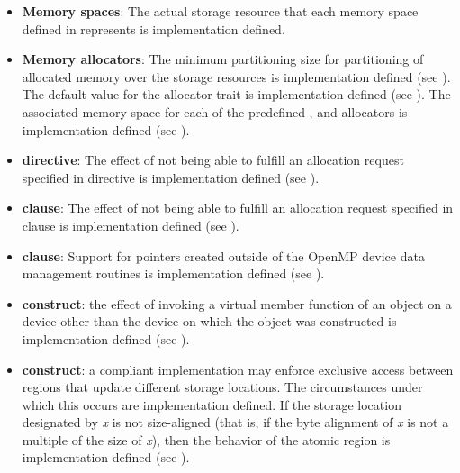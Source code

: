 \begin{itemize}
\item \textbf{Memory spaces}: The actual storage resource that each memory space defined in  represents is implementation defined.

\item \textbf{Memory allocators}: The minimum partitioning size for partitioning of allocated memory over the storage resources is implementation defined (see ).
The default value for the  allocator trait is implementation defined (see ).
The associated memory space for each of the predefined ,  and  allocators is implementation defined (see  ).

\item {} \textbf{directive}: The effect of not being able to fulfill an allocation request specified in  directive is implementation defined (see ).

\item {} \textbf{clause}: The effect of not being able to fulfill an allocation request specified in  clause is implementation defined (see ).

\item {} \textbf{clause}:
  Support for pointers created outside of the OpenMP device data management
  routines is implementation defined (see ).

\item {} \textbf{construct}: the effect of invoking a virtual member
function of an object on a device other than the device on which the object was
constructed is implementation defined (see ).

\item {} \textbf{construct}: a compliant implementation may enforce exclusive access
between  regions that update different storage locations. The circumstances
under which this occurs are implementation defined. If the storage location
designated by \emph{x} is not size-aligned (that is, if the byte alignment of \emph{x} is not a multiple
of the size of \emph{x}), then the behavior of the atomic region is implementation defined (see ).


\end{itemize}
